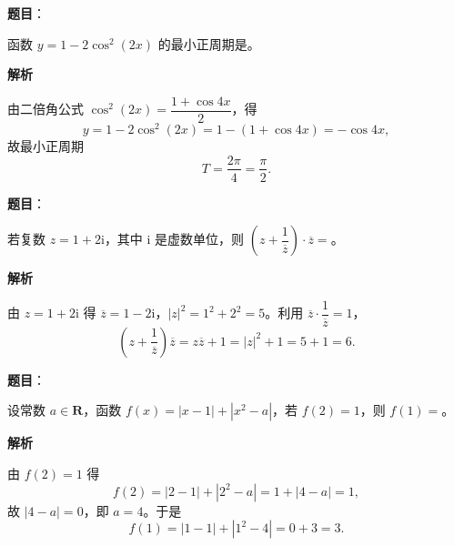 

\begin{answer}

\textbf{题目}：

函数 $y=1-2\cos^2(2x)$ 的最小正周期是\gkblank{}。

\textbf{解析}

由二倍角公式 $\cos^2(2x)=\dfrac{1+\cos4x}{2}$，得
\nopagebreak[4]
\[y=1-2\cos^2(2x)=1-(1+\cos4x)=-\cos4x,\]
故最小正周期
\nopagebreak[4]
\[T=\frac{2\pi}{4}=\frac\pi2 .\]


\end{answer}
\begin{answer}

\textbf{题目}：

若复数 $z=1+2\mathrm i$，其中 $\mathrm i$ 是虚数单位，则 $\left(z+\dfrac1{\overline z}\right)\cdot\overline z=$\gkblank{}。

\textbf{解析}

由 $z=1+2\mathrm i$ 得 $\overline z=1-2\mathrm i$，$|z|^2=1^2+2^2=5$。利用 $\overline z\cdot\dfrac1{\overline z}=1$，
\nopagebreak[4]
\[\left(z+\frac1{\overline z}\right)\overline z=z\overline z+1=|z|^2+1=5+1=6 .\]


\end{answer}
\begin{answer}

\textbf{题目}：

设常数 $a\in\mathbf R$，函数 $f(x)=|x-1|+|x^2-a|$，若 $f(2)=1$，则 $f(1)=$\gkblank{}。

\textbf{解析}

由 $f(2)=1$ 得
\nopagebreak[4]
\[f(2)=|2-1|+|2^2-a|=1+|4-a|=1,\]
故 $|4-a|=0$，即 $a=4$。于是
\nopagebreak[4]
\[f(1)=|1-1|+|1^2-4|=0+3=3 .\]


\end{answer}
